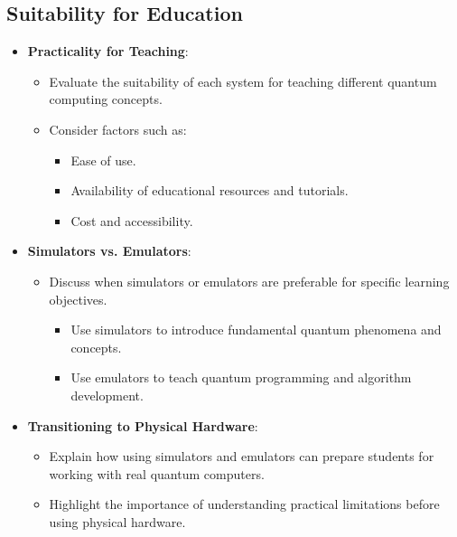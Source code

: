 \subsection{Suitability for Education}
\begin{itemize}
    \item \textbf{Practicality for Teaching}:
        \begin{itemize}
            \item Evaluate the suitability of each system for teaching different quantum computing concepts.
            \item Consider factors such as: 
                \begin{itemize}
                    \item Ease of use.
                    \item Availability of educational resources and tutorials.
                    \item Cost and accessibility. 
                \end{itemize}
        \end{itemize}
    \item \textbf{Simulators vs. Emulators}:
        \begin{itemize}
            \item Discuss when simulators or emulators are preferable for specific learning objectives. 
                \begin{itemize}
                    \item Use simulators to introduce fundamental quantum phenomena and concepts.
                    \item Use emulators to teach quantum programming and algorithm development. 
                \end{itemize}
        \end{itemize}
    \item \textbf{Transitioning to Physical Hardware}:
        \begin{itemize}
            \item Explain how using simulators and emulators can prepare students for working with real quantum computers. 
            \item Highlight the importance of understanding practical limitations before using physical hardware.
        \end{itemize}
\end{itemize}


